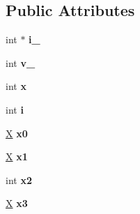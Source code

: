 \subsection*{Public Attributes}
\begin{DoxyCompactItemize}
\item 
\mbox{\label{struct_s_acd22897f2abcfc69a389d8557e77e39a}} 
int $\ast$ {\bfseries i\+\_\+}
\item 
\mbox{\label{struct_s_a20db5055637cdf76c62a062681e81eb0}} 
int {\bfseries v\+\_\+}
\item 
\mbox{\label{struct_s_ab6ead251a80caf7e36416a89e3d0d343}} 
int {\bfseries x}
\item 
\mbox{\label{struct_s_afcecda2c8375e18299badd6ec063f6e8}} 
int {\bfseries i}
\item 
\mbox{\label{struct_s_aa7fef8e4df19f16b19a4f79954d8bf9d}} 
\mbox{\hyperlink{class_x}{X}} {\bfseries x0}
\item 
\mbox{\label{struct_s_a37225c38d33067cd6b5a06de9a377b2a}} 
\mbox{\hyperlink{class_x}{X}} {\bfseries x1}
\item 
\mbox{\label{struct_s_a4624bcd96115207e79ab298e0ab22646}} 
int {\bfseries x2}
\item 
\mbox{\label{struct_s_a15725b0259b374bc02b96acb8d0bbafd}} 
\mbox{\hyperlink{class_x}{X}} {\bfseries x3}
\end{DoxyCompactItemize}


